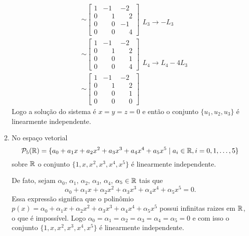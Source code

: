 \begin{exemplos}
\begin{enumerate}
\begin{solucao}
\begin{align*}
\begin{array}{l}
					\end{array}\\&\sim
					\begin{bmatrix}
						1 & -1 & -2\\
						0 & \phantom{-} 1 & \phantom{-} 2\\
						0 & \phantom{-} 0 & -1\\
						0 & \phantom{-} 0 & \phantom{-} 4
					\end{bmatrix}
					\begin{array}{l}
						\phantom{x}\\\phantom{x}\\L_3 \to -L_3\\\phantom{x}
					\end{array}\\&\sim
					\begin{bmatrix}
						1 & -1 & -2\\
						0 & \phantom{-} 1 & \phantom{-} 2\\
						0 & \phantom{-} 0 & \phantom{-} 1\\
						0 & \phantom{-} 0 & \phantom{-} 4
					\end{bmatrix}
					\begin{array}{l}
						\phantom{x}\\\phantom{x}\\\phantom{x}\\L_4 \to L_4 - 4L_3
					\end{array}\\&\sim
					\begin{bmatrix}
						1 & -1 & -2\\
						0 & \phantom{-} 1 & \phantom{-} 2\\
						0 & \phantom{-} 0 & \phantom{-} 1\\
						0 & \phantom{-} 0 & \phantom{-} 0
					\end{bmatrix}
				\end{align*}
				Logo a solução do sistema é $x = y = z = 0$ e então o conjunto $\{u_1, u_2, u_3\}$ é linearmente independente.
			\end{solucao}
			
		\item No espaço vetorial
			\[
				\mathcal{P}_5(\mathbb{R}) = \{a_0 + a_1x + a_2x^2 + a_3x^3 + a_4x^4 + a_5x^5 \mid a_i \in \mathbb{R}, i = 0, 1, \dots, 5 \}
			\]
			sobre $\mathbb{R}$ o conjunto $\{1, x, x^2, x^3, x^4, x^5\}$ é linearmente independente.
			\begin{solucao}
				De fato, sejam $\alpha_0$, $\alpha_1$, $\alpha_2$, $\alpha_3$, $\alpha_4$, $\alpha_5 \in \mathbb{R}$ tais que
				\[
					\alpha_0 + \alpha_1x + \alpha_2x^2 + \alpha_3x^3 + \alpha_4x^4 + \alpha_5x^5 = 0.
				\]
				Essa expressão significa que o polinômio $p(x) = \alpha_0 + \alpha_1x + \alpha_2x^2 + \alpha_3x^3 + \alpha_4x^4 + \alpha_5x^5$ possui infinitas raizes em $\mathbb{R}$, o que é impossível. Logo
				$\alpha_0 = \alpha_1 = \alpha_2 = \alpha_3 = \alpha_4 = \alpha_5 = 0$ e com isso o conjunto $\{1, x, x^2, x^3, x^4, x^5\}$ é linearmente independente.
			\end{solucao}
			

\end{enumerate}
\end{exemplos}
